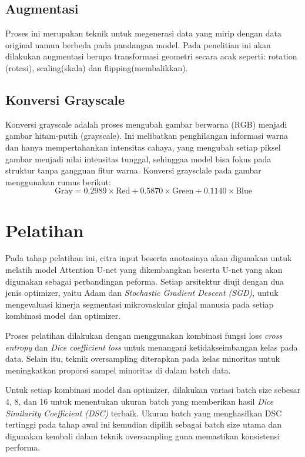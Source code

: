 \subsection{Augmentasi}

\noindent Proses ini merupakan teknik untuk megenerasi  data yang mirip dengan data original namun berbeda pada pandangan model. Pada penelitian ini akan dilakukan augmentasi berupa transformasi geometri secara acak seperti: rotation (rotasi), scaling(skala) dan flipping(membalikkan).

\subsection{Konversi Grayscale}
\noindent Konversi grayscale adalah proses mengubah gambar berwarna (RGB) menjadi gambar hitam-putih (grayscale). Ini melibatkan penghilangan informasi warna dan hanya mempertahankan intensitas cahaya, yang mengubah setiap piksel gambar menjadi nilai intensitas tunggal, sehinggaa model bisa fokus pada struktur tanpa gangguan fitur warna. Konversi graysclale pada gambar menggunakan rumus berikut:
    \begin{equation}
	\text{Gray} = 0.2989 \times \text{Red} + 0.5870 \times \text{Green} + 0.1140 \times \text{Blue}
\end{equation}




\section{Pelatihan}
\noindent Pada tahap pelatihan ini, citra input beserta anotasinya akan digunakan untuk melatih model Attention U-net yang dikembangkan beserta U-net yang akan digunakan sebagai perbandingan peforma. Setiap arsitektur diuji dengan dua jenis optimizer, yaitu Adam dan \textit{Stochastic Gradient Descent (SGD)}, untuk mengevaluasi kinerja segmentasi mikrovaskular ginjal manusia pada setiap kombinasi model dan optimizer.

Proses pelatihan dilakukan dengan menggunakan kombinasi fungsi loss \textit{cross entropy} dan \textit{Dice coefficient loss} untuk menangani ketidakseimbangan kelas pada data. Selain itu, teknik oversampling diterapkan pada kelas minoritas untuk meningkatkan proporsi sampel minoritas di dalam batch data.

Untuk setiap kombinasi model dan optimizer, dilakukan variasi batch size sebesar 4, 8, dan 16 untuk menentukan ukuran batch yang memberikan hasil \textit{Dice Similarity Coefficient (DSC)} terbaik. Ukuran batch yang menghasilkan DSC tertinggi pada tahap awal ini kemudian dipilih sebagai batch size utama dan digunakan kembali dalam teknik oversampling guna memastikan konsistensi performa.

